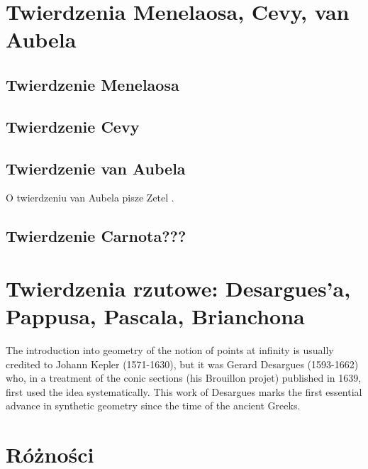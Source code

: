 
%

\section{Twierdzenia Menelaosa, Cevy, van Aubela}
\subsection{Twierdzenie Menelaosa}

\subsection{Twierdzenie Cevy}
 

\subsection{Twierdzenie van Aubela}
O twierdzeniu van Aubela pisze Zetel \cite[s. 24]{zetel_2020}.


\subsection{Twierdzenie Carnota???}


\section{Twierdzenia rzutowe: Desargues'a, Pappusa, Pascala, Brianchona}




The introduction into geometry of the notion of points at infinity is usually credited to Johann Kepler (1571-1630), but it was Gerard
Desargues (1593-1662) who, in a treatment of the conic sections
(his Brouillon projet) published in 1639, first used the idea systematically. This work of Desargues marks the first essential advance in synthetic geometry since the time of the ancient Greeks.

\section{Różności}



%